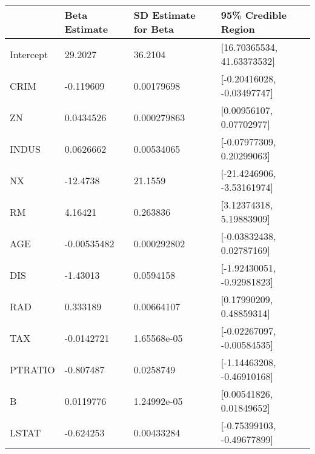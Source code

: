 \begin{tabular}{llll}
\hline
           & Beta Estimate   & SD Estimate for Beta   & 95\% Credible Region        \\
\hline
 Intercept & 29.2027         & 36.2104                & [16.70365534, 41.63373532] \\
 CRIM      & -0.119609       & 0.00179698             & [-0.20416028, -0.03497747] \\
 ZN        & 0.0434526       & 0.000279863            & [0.00956107, 0.07702977]   \\
 INDUS     & 0.0626662       & 0.00534065             & [-0.07977309, 0.20299063]  \\
 NX        & -12.4738        & 21.1559                & [-21.4246906, -3.53161974] \\
 RM        & 4.16421         & 0.263836               & [3.12374318, 5.19883909]   \\
 AGE       & -0.00535482     & 0.000292802            & [-0.03832438, 0.02787169]  \\
 DIS       & -1.43013        & 0.0594158              & [-1.92430051, -0.92981823] \\
 RAD       & 0.333189        & 0.00664107             & [0.17990209, 0.48859314]   \\
 TAX       & -0.0142721      & 1.65568e-05            & [-0.02267097, -0.00584535] \\
 PTRATIO   & -0.807487       & 0.0258749              & [-1.14463208, -0.46910168] \\
 B         & 0.0119776       & 1.24992e-05            & [0.00541826, 0.01849652]   \\
 LSTAT     & -0.624253       & 0.00433284             & [-0.75399103, -0.49677899] \\
\hline
\end{tabular}